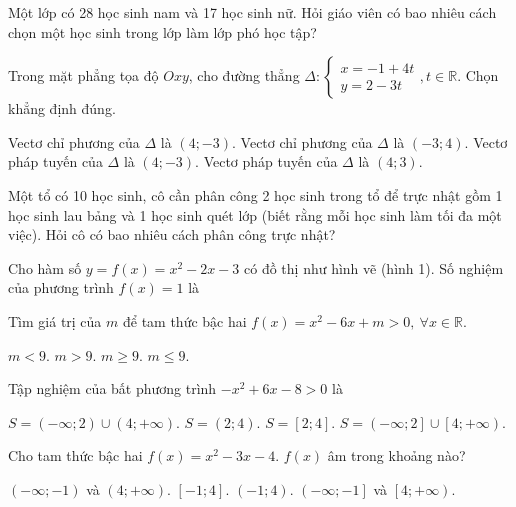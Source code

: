 
\NQuestion Một lớp có 28 học sinh nam và 17 học sinh nữ. Hỏi giáo viên có bao nhiêu cách chọn một học sinh trong lớp làm lớp phó học tập?


\NQuestion Trong mặt phẳng tọa độ $Oxy$, cho đường thẳng
$
\Delta:
\begin{cases}
x = -1+4t\\
y = 2-3t
\end{cases},
t\in\mathbb{R}.
$
Chọn khẳng định đúng.

\ChoicesTwoLines
{Vectơ chỉ phương của $\Delta$ là $\left(4;-3\right)$.}
{Vectơ chỉ phương của $\Delta$ là $\left(-3;4\right)$.}
{Vectơ pháp tuyến của $\Delta$ là $\left(4;-3\right)$.}
{Vectơ pháp tuyến của $\Delta$ là $\left(4;3\right)$.}

\NQuestion Một tổ có 10 học sinh, cô cần phân công 2 học sinh trong tổ để trực nhật gồm 1 học sinh lau bảng và 1 học sinh quét lớp (biết rằng mỗi học sinh làm tối đa một việc). Hỏi cô có bao nhiêu cách phân công trực nhật?


\NQuestion Cho hàm số $y=f\left(x\right)=x^2-2x-3$ có đồ thị như hình vẽ (hình 1). Số nghiệm của phương trình $f\left(x\right)=1$ là

\begin{center}

\end{center}


\NQuestion Tìm giá trị của $m$ để tam thức bậc hai $f\left(x\right)=x^2-6x+m>0,\ \forall x\in\mathbb{R}$.

\ChoicesOneLine
{$m<9$.}
{$m>9$.}
{$m\ge 9$.}
{$m\le 9$.}

\NQuestion Tập nghiệm của bất phương trình $-x^2+6x-8>0$ là

\ChoicesTwoLines
{$S=\left(-\infty;2\right)\cup\left(4;+\infty\right)$.}
{$S=\left(2;4\right)$.}
{$S=\left[2;4\right]$.}
{$S=\left(-\infty;2\right]\cup\left[4;+\infty\right)$.}

\NQuestion Cho tam thức bậc hai $f\left(x\right)=x^2-3x-4$. $f\left(x\right)$ âm trong khoảng nào?

\ChoicesTwoLines
{$\left(-\infty;-1\right)$ và $\left(4;+\infty\right)$.}
{$\left[-1;4\right]$.}
{$\left(-1;4\right)$.}
{$\left(-\infty;-1\right]$ và $\left[4;+\infty\right)$.}

